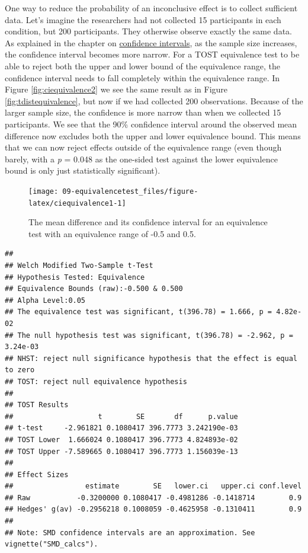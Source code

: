 \documentclass[
  oneside]{book}
\begin{document}
One way to reduce the probability of an inconclusive effect is to collect sufficient data. Let's imagine the researchers had not collected 15 participants in each condition, but 200 participants. They otherwise observe exactly the same data. As explained in the chapter on \protect\hyperlink{confint}{confidence intervals}, as the sample size increases, the confidence interval becomes more narrow. For a TOST equivalence test to be able to reject both the upper and lower bound of the equivalence range, the confidence interval needs to fall completely within the equivalence range. In Figure \ref{fig:ciequivalence2} we see the same result as in Figure \ref{fig:tdistequivalence}, but now if we had collected 200 observations. Because of the larger sample size, the confidence is more narrow than when we collected 15 participants. We see that the 90\% confidence interval around the observed mean difference now excludes both the upper and lower equivalence bound. This means that we can now reject effects outside of the equivalence range (even though barely, with a \emph{p} = 0.048 as the one-sided test against the lower equivalence bound is only just statistically significant).



\begin{figure}

{\centering \texttt{[image: 09-equivalencetest\_files/figure-latex/ciequivalence1-1]} 

}

\caption{The mean difference and its confidence interval for an equivalence test with an equivalence range of -0.5 and 0.5.}\label{fig:ciequivalence1}
\end{figure}

\begin{verbatim}
## 
## Welch Modified Two-Sample t-Test
## Hypothesis Tested: Equivalence
## Equivalence Bounds (raw):-0.500 & 0.500
## Alpha Level:0.05
## The equivalence test was significant, t(396.78) = 1.666, p = 4.82e-02
## The null hypothesis test was significant, t(396.78) = -2.962, p = 3.24e-03
## NHST: reject null significance hypothesis that the effect is equal to zero 
## TOST: reject null equivalence hypothesis
## 
## TOST Results 
##                    t        SE       df      p.value
## t-test     -2.961821 0.1080417 396.7773 3.242190e-03
## TOST Lower  1.666024 0.1080417 396.7773 4.824893e-02
## TOST Upper -7.589665 0.1080417 396.7773 1.156039e-13
## 
## Effect Sizes 
##                 estimate        SE   lower.ci   upper.ci conf.level
## Raw           -0.3200000 0.1080417 -0.4981286 -0.1418714        0.9
## Hedges' g(av) -0.2956218 0.1008059 -0.4625958 -0.1310411        0.9
## 
## Note: SMD confidence intervals are an approximation. See vignette("SMD_calcs").
\end{verbatim}
\end{document}
